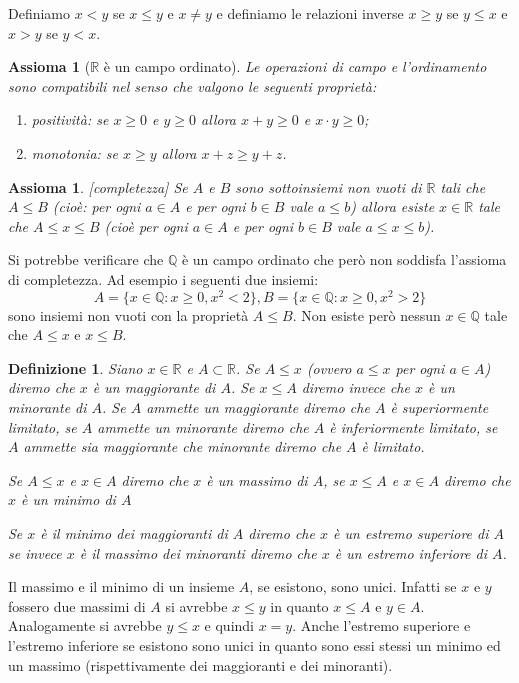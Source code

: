 \documentclass[italian,a4paper,oneside,headinclude]{scrbook}
\newcommand{\QQ}{\mathbb Q}
\newcommand{\RR}{\mathbb R}
\newtheorem{definition}[theorem]{Definizione}
\newtheorem{axiom}[theorem]{Assioma}
\begin{document}
Definiamo $x<y$ se $x\le y$ e $x \neq y$ e definiamo le relazioni
inverse $x \ge y$ se $y\le x$ e $x>y$ se $y<x$.

\begin{axiom}[$\RR$ è un campo ordinato]
Le operazioni di campo e l'ordinamento sono compatibili nel senso che
valgono le seguenti proprietà:
\begin{enumerate}
\item positività: se $x\ge 0$ e $y \ge 0$ allora $x+y \ge 0$ e $x\cdot y\ge 0$;
\item monotonia: se $x \ge y$ allora $x+z \ge y+z$.
\end{enumerate}
\end{axiom}

\begin{axiom}\label{axiom_complete}[completezza]
Se $A$ e $B$ sono sottoinsiemi non vuoti di $\RR$ tali che $A \le B$
(cioè: per ogni $a \in A$ e per ogni $b\in B$ vale $a\le b$) allora esiste
$x\in \RR$ tale che $A\le x \le B$ (cioè per ogni $a\in A$ e per ogni $b\in B$
vale $a\le x \le b$).
\end{axiom}

Si potrebbe verificare che $\QQ$ è un campo ordinato che però non soddisfa l'assioma
di completezza. Ad esempio i seguenti due insiemi:
\[
  A= \{x\in \QQ\colon x\ge 0, x^2 < 2\},
  B = \{x\in \QQ\colon x\ge 0, x^2 > 2\}
\]
sono insiemi non vuoti con la proprietà $A\le B$.
Non esiste però nessun $x\in \QQ$ tale che $A\le x$ e $x\le B$.


\begin{definition}
Siano $x \in \RR$ e $A \subset \RR$. Se $A\le x$ (ovvero $a\le x$ per ogni $a\in A$)
diremo che $x$ è un \emph{maggiorante} di $A$.
Se $x \le A$ diremo invece che $x$ è un \emph{minorante} di $A$.
Se $A$ ammette un maggiorante diremo che $A$ è \emph{superiormente limitato},
se $A$ ammette un minorante diremo che $A$ è \emph{inferiormente limitato},
se $A$ ammette sia maggiorante che minorante diremo che $A$ è \emph{limitato}.

Se $A \le x$ e $x\in A$ diremo che $x$ è un massimo di $A$,
se $x\le A$ e $x\in A$ diremo che $x$ è un minimo di $A$

Se $x$ è il minimo dei maggioranti di $A$ diremo che $x$ è
un \emph{estremo superiore}
di $A$ se invece $x$ è il massimo dei minoranti diremo che $x$ è
un \emph{estremo inferiore} di $A$.
\end{definition}

Il massimo e il minimo di un insieme $A$, se esistono, sono unici.
Infatti se $x$ e $y$ fossero due massimi di $A$ si avrebbe $x\le y$ in
quanto $x\le A$ e $y\in A$. Analogamente si avrebbe $y\le x$ e
quindi $x=y$.
Anche l'estremo superiore e l'estremo inferiore se esistono sono
unici in quanto sono essi stessi un minimo ed un massimo
(rispettivamente dei maggioranti e dei minoranti).
\end{document}
